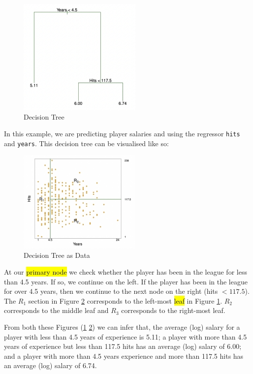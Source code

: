 \documentclass[11pt]{article}
\begin{document}
\begin{figure}[h]
    \centering
    \includegraphics[width=6cm]{pic/decision tree.png}
    \caption{Decision Tree}
    \label{fig:decision tree}
\end{figure}

In this example, we are predicting player salaries and using the regressor \lstinline{hits} and \lstinline{years}. This decision tree can be visualised like so:

\begin{figure}[h]
    \centering
    \includegraphics[width=6cm]{pic/decision tree parts.png}
    \caption{Decision Tree as Data}
    \label{fig:decision tree parts}
\end{figure}

At our \hl{primary node} we check whether the player has been in the league for less than 4.5 years. If so, we continue on the left. If the player has been in the league for over 4.5 years, then we continue to the next node on the right (hits $< 117.5$). The $R_1$ section in Figure \ref{fig:decision tree parts} corresponds to the left-most \hl{leaf} in Figure \ref{fig:decision tree}. $R_2$ corresponds to the middle leaf and $R_3$ corresponds to the right-most leaf. 

\begin{note}
    From both these Figures (\ref{fig:decision tree} \ref{fig:decision tree parts}) we can infer that, the average (log) salary for a player with less than 4.5 years of experience is 5.11; a player with more than 4.5 years of experience but less than 117.5 hits has an average (log) salary of 6.00; and a player with more than 4.5 years experience and more than 117.5 hits has an average (log) salary of 6.74.
\end{note}
\end{document}
